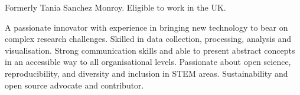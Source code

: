 


\begin{cvparagraph}

Formerly Tania Sanchez Monroy. Eligible to work
in the UK.

A passionate innovator with experience in bringing new technology to bear on
complex research challenges. Skilled in data collection, processing, analysis and visualisation.
Strong communication skills and able to present abstract
concepts in an accessible way to all organisational levels.
Passionate about open science, reproducibility, and diversity and inclusion in STEM areas. Sustainability and open source advocate and contributor.
\end{cvparagraph}
